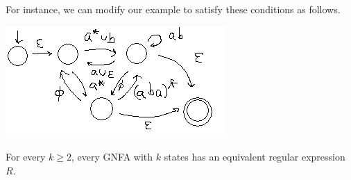 For instance, we can modify our example to satisfy these conditions as follows.

\begin{center}
\includegraphics{3-2}
\end{center}

\begin{lem}
For every $k\ge 2$, every GNFA with $k$ states has an equivalent regular expression $R$.
\end{lem}
